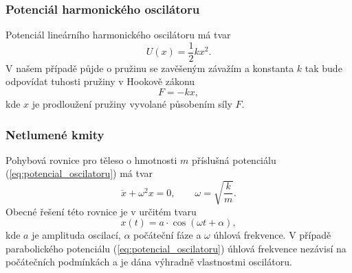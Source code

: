 \documentclass[english]{article}
\begin{document}
	\subsubsection{Potenciál harmonického oscilátoru}
		Potenciál lineárního harmonického oscilátoru má tvar 
		\begin{equation} \label{eq:potencial_oscilatoru}
		U(x) = \frac{1}{2}kx^2.
		\end{equation}
		V našem případě půjde o pružinu se zavěšeným závažím a konstanta $k$ tak bude odpovídat tuhosti pružiny v Hookově zákonu
		\begin{equation} \label{eq:hookuv_zakon}
		F = -kx,
		\end{equation}
		kde $x$ je prodloužení pružiny vyvolané působením síly $F$.
	
	\subsubsection{Netlumené kmity}
		Pohybová rovnice pro těleso o hmotnosti $m$ příslušná potenciálu (\ref{eq:potencial_oscilatoru}) má tvar 
		\begin{equation} \label{eq:pohybova_rovnice_lho}
		\ddot{x} + \omega^2 x = 0,\qquad \omega = \sqrt{\frac{k}{m}}.
		\end{equation}
		Obecné řešení této rovnice je v určitém tvaru 
		\begin{equation}
		x(t) = a\cdot \cos( \omega t + \alpha),
		\end{equation}
		kde $a$ je amplituda oscilací, $\alpha$ počáteční fáze a $\omega$ úhlová frekvence. V případě parabolického potenciálu (\ref{eq:potencial_oscilatoru}) úhlová frekvence nezávisí na počátečních podmínkách a je dána výhradně vlastnostmi oscilátoru.
\iffalse	
\end{document}
